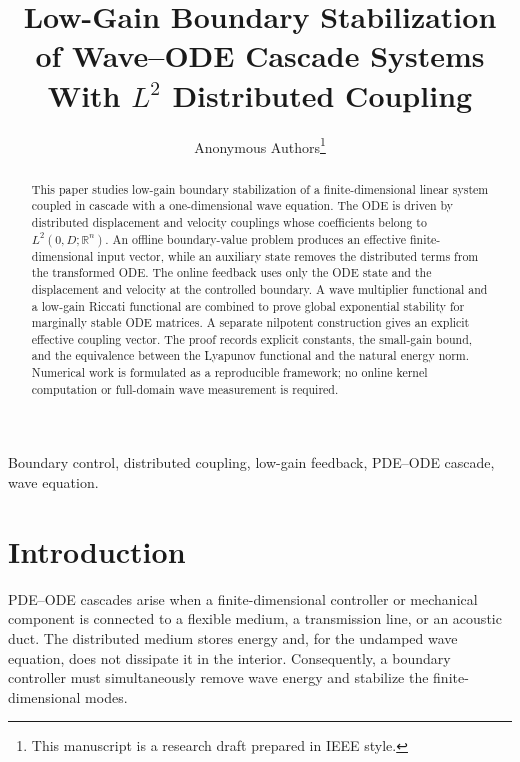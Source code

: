\documentclass[journal]{IEEEtran}
\newcommand{\R}{\mathbb R}
\begin{document}
\title{Low-Gain Boundary Stabilization of Wave--ODE Cascade Systems With \(L^2\) Distributed Coupling}

\author{Anonymous Authors\thanks{This manuscript is a research draft prepared in IEEE style.}}


\maketitle

\begin{abstract}
This paper studies low-gain boundary stabilization of a finite-dimensional linear system coupled in cascade with a one-dimensional wave equation. The ODE is driven by distributed displacement and velocity couplings whose coefficients belong to \(L^2(0,D;\R^n)\). An offline boundary-value problem produces an effective finite-dimensional input vector, while an auxiliary state removes the distributed terms from the transformed ODE. The online feedback uses only the ODE state and the displacement and velocity at the controlled boundary. A wave multiplier functional and a low-gain Riccati functional are combined to prove global exponential stability for marginally stable ODE matrices. A separate nilpotent construction gives an explicit effective coupling vector. The proof records explicit constants, the small-gain bound, and the equivalence between the Lyapunov functional and the natural energy norm. Numerical work is formulated as a reproducible framework; no online kernel computation or full-domain wave measurement is required.
\end{abstract}

\begin{IEEEkeywords}
Boundary control, distributed coupling, low-gain feedback, PDE--ODE cascade, wave equation.
\end{IEEEkeywords}

\section{Introduction}

PDE--ODE cascades arise when a finite-dimensional controller or mechanical component is connected to a flexible medium, a transmission line, or an acoustic duct. The distributed medium stores energy and, for the undamped wave equation, does not dissipate it in the interior. Consequently, a boundary controller must simultaneously remove wave energy and stabilize the finite-dimensional modes.
\end{document}
